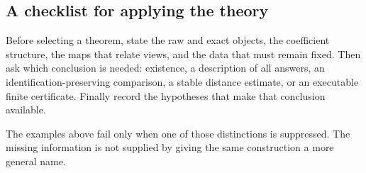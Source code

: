 \subsection*{A checklist for applying the theory}
Before selecting a theorem, state the raw and exact objects, the coefficient structure, the maps that relate views, and the data that must remain fixed. Then ask which conclusion is needed: existence, a description of all answers, an identification-preserving comparison, a stable distance estimate, or an executable finite certificate. Finally record the hypotheses that make that conclusion available.

The examples above fail only when one of those distinctions is suppressed. The missing information is not supplied by giving the same construction a more general name.

